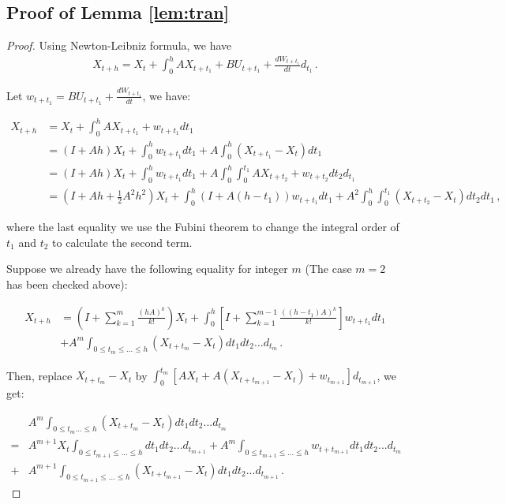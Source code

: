 \documentclass{article}
\theoremstyle{definition}
\begin{document}
\subsection{Proof of Lemma \ref{lem:tran}}
\label{supp:lem1}
\tran*


\begin{proof}
    Using Newton-Leibniz formula, we have
\begin{align*}
X_{t+h} = X_{t}+\int_{0}^{h}AX_{t+t_{1}}+BU_{t+t_{1}}+\frac{dW_{t+t_{1}}}{dt}d_{t_{1}} \,.
\end{align*}

Let $w_{t+t_1} = BU_{t+t_1}+\frac{dW_{t+t_1}}{dt}$, we have:

\begin{align*}
    X_{t+h} &= X_{t}+\int_{0}^{h}AX_{t+t_{1}}+w_{t+t_{1}}dt_{1} \\
&=(I+Ah)X_{t}+\int_{0}^{h}w_{t+t_{1}}dt_{1}+A\int_{0}^{h}(X_{t+t_{1}}-X_{t})dt_{1} \\
&=(I+Ah)X_{t}+\int_{0}^{h}w_{t+t_{1}}dt_{1}+A\int_{0}^{h}\int_{0}^{t_{1}}A{X_{t+t_{2}}}+w_{t+t_{2}}dt_{2}d_{t_{1}} \\
&=(I+Ah+\frac{1}{2}A^{2}h^{2})X_{t}+\int_{0}^{h}(I+A(h-t_{1}))w_{t+t_{1}}dt_{1}+A^{2}\int_{0}^{h}\int_{0}^{t_{1}}(X_{t+t_{2}}-X_{t})dt_{2}dt_{1} \,,
\end{align*}

where the last equality we use the Fubini theorem to change the integral order of $t_1$ and $t_2$ to calculate the second term.

Suppose we already have the following equality for integer $m$ (The case $m = 2$ has been checked above):


\begin{align*}
    X_{t+h} &= (I+\sum_{k=1}^{m}\frac{(hA)^{k}}{k!})X_{t}+\int_{0}^{h}[I+\sum_{k=1}^{m-1}\frac{{((h-t_{1})A)}^{k}}{k!}]w_{t+t_{1}}dt_{1} \\
    &+A^{m}\int_{0\le t_{m}\le ... \le h}(X_{t+t_{m}}-X_{t})dt_{1}dt_{2}...d_{t_{m}} \,.
\end{align*}

Then, replace $X_{t+t_{m}} - X_t$ by $\int_{0}^{t_{m}}[AX_{t}+A(X_{t+t_{m+1}}-X_{t})+w_{t_{m+1}}]d_{t_{m+1}}$,
we get:

\begin{align*}
    &A^{m}\int_{0\le t_{m}...\le h}(X_{t+t_{m}}-X_{t})dt_{1}dt_{2}...d_{t_{m}}\\
    =&A^{m+1}X_{t}\int_{0\le t_{m+1}\le ...\le h} dt_{1}dt_{2}...d_{t_{m+1}}
+A^{m}\int_{0\le t_{m+1}\le ...\le h}w_{t+t_{m+1}}dt_{1}dt_{2}...d_{t_{m}}\\
+&A^{m+1}\int_{0\le t_{m+1}\le ...\le h}(X_{t+t_{m+1}}-X_{t})dt_{1}dt_{2}...d_{t_{m+1}} \,.
\end{align*}




\end{proof}
\end{document}
